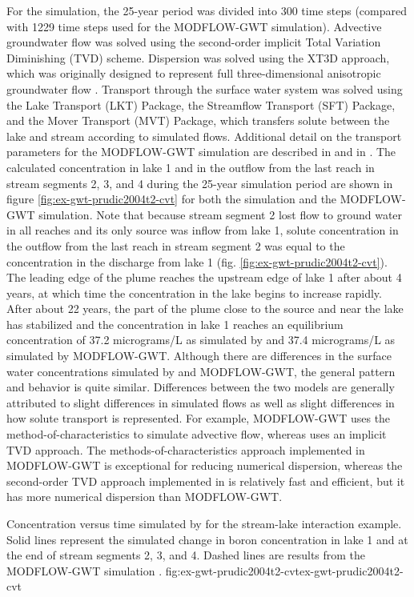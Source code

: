For the \mf simulation, the 25-year period was divided into 300 time steps (compared with 1229 time steps used for the MODFLOW-GWT simulation).  Advective groundwater flow was solved using the second-order implicit Total Variation Diminishing (TVD) scheme.  Dispersion was solved using the XT3D approach, which was originally designed to represent full three-dimensional anisotropic groundwater flow \citep{modflow6xt3d}.  Transport through the surface water system was solved using the Lake Transport (LKT) Package, the Streamflow Transport (SFT) Package, and the Mover Transport (MVT) Package, which transfers solute between the lake and stream according to simulated flows.  Additional detail on the transport parameters for the MODFLOW-GWT simulation are described in \cite{modflowsfr1pack} and in \cite{modflowlak3pack}.  The calculated concentration in lake 1 and in the outflow from the last reach in stream segments 2, 3, and 4 during the 25-year simulation period are shown in figure \ref{fig:ex-gwt-prudic2004t2-cvt} for both the \mf simulation and the MODFLOW-GWT simulation.  Note that because stream segment 2 lost flow to ground water in all reaches and its only source was inflow from lake 1, solute concentration in the outflow from the last reach in stream segment 2 was equal to the concentration in the discharge from lake 1 (fig. \ref{fig:ex-gwt-prudic2004t2-cvt}).  The leading edge of the plume reaches the upstream edge of lake 1 after about 4 years, at which time the concentration in the lake begins to increase rapidly. After about 22 years, the part of the plume close to the source and near the lake has stabilized and the concentration in lake 1 reaches an equilibrium concentration of 37.2 micrograms/L as simulated by \mf and 37.4 micrograms/L as simulated by MODFLOW-GWT.  Although there are differences in the surface water concentrations simulated by \mf and MODFLOW-GWT, the general pattern and behavior is quite similar.  Differences between the two models are generally attributed to slight differences in simulated flows as well as slight differences in how solute transport is represented.  For example, MODFLOW-GWT uses the method-of-characteristics to simulate advective flow, whereas \mf uses an implicit TVD approach.  The methods-of-characteristics approach implemented in MODFLOW-GWT is exceptional for reducing numerical dispersion, whereas the second-order TVD approach implemented in \mf is relatively fast and efficient, but it has more numerical dispersion than MODFLOW-GWT.  

\begin{StandardFigure}{
                                     Concentration versus time simulated by \mf for the stream-lake interaction example.  Solid lines represent the \mf simulated change in boron concentration in lake 1 and at the end of stream segments 2, 3, and 4.  Dashed lines are results from the MODFLOW-GWT simulation \citep{modflowsfr1pack}.  
                                     }{fig:ex-gwt-prudic2004t2-cvt}{ex-gwt-prudic2004t2-cvt}
\end{StandardFigure}            

